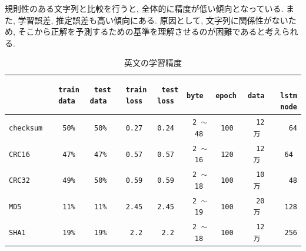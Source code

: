\documentclass[11pt]{jbook}
\begin{document}
規則性のある文字列と比較を行うと, 全体的に精度が低い傾向となっている.
また, 学習誤差, 推定誤差も高い傾向にある.
原因として, 文字列に関係性がないため, そこから正解を予測するための基準を理解させるのが困難であると考えられる.


\begin{table}[htp]
   \begin{center}
    \caption{英文の学習精度}
    \small
    \smallskip
    \begin{tabular}{|l|r|r|r|r|r|r|r|r|}
    \hline
      &\texttt{train data }&\texttt{test data }&\texttt{train loss }&\texttt{test loss  }&\texttt{byte }&\texttt{epoch }&\texttt{data} &　\texttt{lstm node} \\ \hline
    \texttt{checksum  }&\texttt{50\% }&\texttt{50\% }&\texttt{0.27  }&\texttt{0.24 }&\texttt{2 $\sim$ 48 }&\texttt{100 }&\texttt{12 万 }&\texttt{64} \\ \hline
    \texttt{CRC16  }&\texttt{47\% }&\texttt{47\% }&\texttt{0.57 }&\texttt{0.57  }&\texttt{2 $\sim$ 16 }&\texttt{120 }&\texttt{12 万 }&\texttt{64 } \\ \hline
    \texttt{CRC32  }&\texttt{49\% }&\texttt{50\% }&\texttt{0.59 }&\texttt{0.59  }&\texttt{2 $\sim$ 18 }&\texttt{100 }&\texttt{10 万 }&\texttt{48}\\ \hline
    \texttt{MD5 }&\texttt{11\% }&\texttt{11\% }&\texttt{2.45  }&\texttt{2.45  }&\texttt{2 $\sim$ 19 }&\texttt{100 }&\texttt{20 万 }&\texttt{128} \\ \hline
    \texttt{SHA1    }&\texttt{19\% }&\texttt{19\% }&\texttt{2.2  }&\texttt{2.2  }&\texttt{2 $\sim$ 18 }&\texttt{100 }&\texttt{12 万 }&\texttt{256}\\ \hline

    \end{tabular}
    \label{english}
   \end{center}

\end{table}
\end{document}
